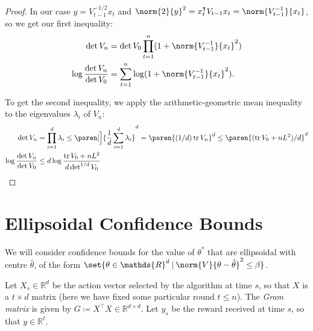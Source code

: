 \documentclass{article}
\newcommand{\defeq}{\coloneq}
\newcommand{\inv}[1]{#1^{-1}}
\newcommand{\Real}{\mathds{R}}
\DeclareMathOperator{\tr}{tr}
\newcommand\given[1][\delimsize]{%
  \providecommand{\delimsize}{}
  \nonscript\:#1\vert\allowbreak\nonscript\:\mathopen{}
}
\DeclarePairedDelimiter{\paren}()
\DeclarePairedDelimiter{\set}\{\}
\newcommand{\transp}[1]{#1^\intercal}
\begin{document}
\begin{lemma}
\begin{proof}
    In our case $y = V_{t-1}^{-1/2}x_t$ and $\norm{2}{y}^2 =
    \transp{x_t}V_{t-1}x_t = \norm{\inv{V_{t-1}}}{x_t}$, so we get our
    first inequality:
    \begin{align*}
      \det V_n &= \det V_0 \prod_{t=1}^n(1 + \norm{\inv{V_{t-1}}}{x_t}^2) \\
      \log\frac{\det V_n}{\det V_0} &= \sum_{t=1}^n\log(1+\norm{\inv{V_{t-1}}}{x_t}^2).
    \end{align*}

    To get the second inequality, we apply the arithmetic-geometric
    mean inequality to the eigenvalues $\lambda_i$ of $V_n$:
    \begin{align*}
      \det V_n &= \prod_{i=1}^d \lambda_i
                \le \paren[\Big]{\frac{1}{d} \sum_{i=1}^d \lambda_i}^d
                = \paren{(1/d)\tr V_n}^d
                \le \paren{(\tr V_0 + nL^2)/d}^d \\
      \log\frac{\det V_n}{\det V_0}
              &\le d\log\frac{\tr V_0 + nL^2}{d\det^{1/d}V_0}
    \end{align*}

  \end{proof}

\end{lemma}

\section{Ellipsoidal Confidence Bounds}
\label{sec:ellips-conf-bounds}

We will consider confidence bounds for the value of $\theta^*$ that are
ellipsoidal with centre $\hat{\theta}$, of the form
$\set{\theta\in\Real^d \given \norm{V}{\theta-\hat{\theta}}^2 \le
  \beta}$.

Let $X_s \in \Real^d$ be the action vector selected by the algorithm at
time $s$, so that $X$ is a $t \times d$ matrix (here we have fixed
some particular round $t \le n$).  The \emph{Gram matrix} is given by
$G \defeq \transp{X}X \in \Real^{d \times d}$.  Let $y_s$ be the reward
received at time $s$, so that $y\in\Real^t$.
\end{document}
